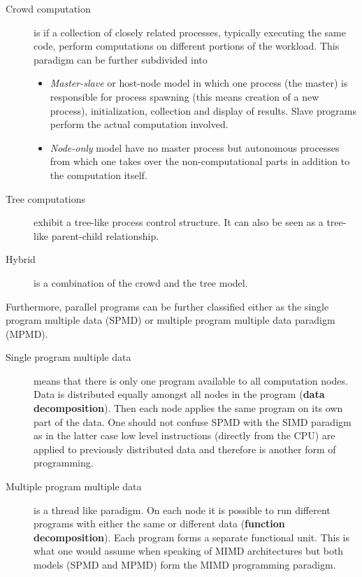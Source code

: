 \begin{description}
\item[Crowd computation] is if a collection of closely related
  processes, typically executing the same code, perform computations
  on different portions of the workload. This paradigm can be further
  subdivided into
  \begin{itemize}
  \item \textit{Master-slave} or host-node model in which one process (the
    master) is responsible for process spawning (this means creation
    of a new process), initialization, collection and display of
    results. Slave programs perform the actual computation involved.
  \item \textit{Node-only} model have no master process but autonomous
    processes from which one takes over the non-computational parts
    in addition to the computation itself.
  \end{itemize}
\item[Tree computations] exhibit a tree-like process control
  structure. It can also be seen as a tree-like parent-child
  relationship.
\item[Hybrid] is a combination of the crowd and the tree model.
\end{description}

Furthermore, parallel programs can be further classified either as the
single program multiple data (SPMD) or multiple program multiple data
paradigm (MPMD). 

\begin{description}
\item[Single program multiple data] means that there is only one
  program available to all computation nodes. Data is distributed
  equally amongst all nodes in the program (\textbf{data
    decomposition}). Then each node applies the
  same program on its own part of the data. One should not confuse
  SPMD with the SIMD paradigm as in the latter case low level
  instructions (directly from the CPU) are applied to previously
  distributed data and therefore is another form of programming.
\item[Multiple program multiple data] is a thread like
  paradigm. On each node it is possible to run different programs with
  either the same or different data (\textbf{function
    decomposition}). Each program forms a separate
  functional unit. This is what one would assume when speaking of MIMD
  architectures but both models (SPMD and MPMD) form the MIMD
  programming paradigm. 
\end{description}


